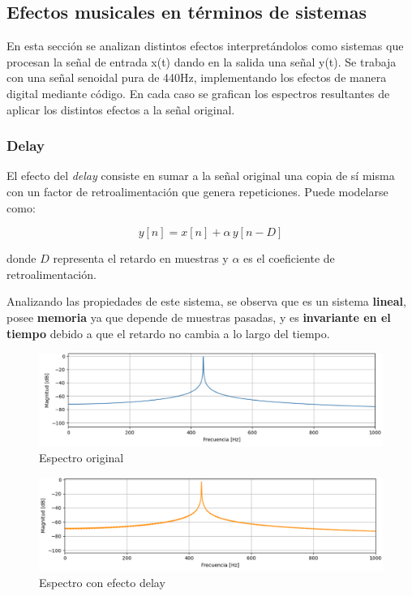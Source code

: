 \documentclass[12pt]{article}
\begin{document}
\hypertarget{Efectos-musicales-en-términos-de-sistemas}{%
\subsection{Efectos musicales en términos de sistemas}\label{Efectos-musicales-en-términos-de-sistemas}}

En esta sección se analizan distintos efectos interpretándolos como sistemas que procesan la señal de entrada x(t) dando en la salida una señal y(t). 
Se trabaja con una señal senoidal pura de 440Hz, implementando los efectos de manera digital mediante código. En cada caso se grafican los espectros resultantes de aplicar los distintos efectos a la señal original.

\subsubsection{Delay}

El efecto del \textit{delay} consiste en sumar a la señal original una copia de sí misma con un factor de retroalimentación que genera repeticiones. Puede modelarse como:

\[
y[n] = x[n] + \alpha\, y[n - D]
\]

donde $D$ representa el retardo en muestras y $\alpha$ es el coeficiente de retroalimentación.

Analizando las propiedades de este sistema, se observa que es un sistema \textbf{lineal}, posee \textbf{memoria} ya que depende de muestras pasadas, y es \textbf{invariante en el tiempo} debido a que el retardo no cambia a lo largo del tiempo.

\begin{figure}[H]
    \centering
    \includegraphics[width=0.75\linewidth]{plot/delay_original.png}
    \caption{Espectro original}
    \label{delay_original}
\end{figure}

\begin{figure}[H]
    \centering
    \includegraphics[width=0.75\linewidth]{plot/delay_efecto.png}
    \caption{Espectro con efecto delay}
    \label{delay_efecto}
\end{figure}
\end{document}
